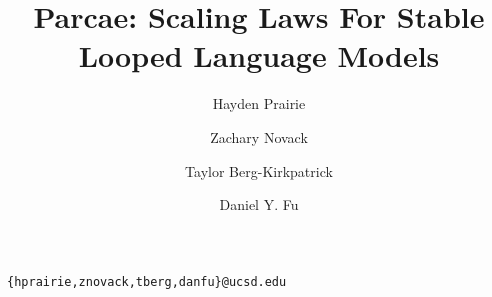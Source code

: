 \documentclass[11pt]{article}
\title{Parcae: Scaling Laws For Stable Looped Language Models}
\author[1,2]{Hayden Prairie}
\author[1]{Zachary Novack}
\author[1]{Taylor Berg-Kirkpatrick}
\author[1,2]{Daniel Y. Fu}
\affil[1]{University of California, San Diego}
\affil[2]{Together AI}
\date{}
\begin{document}
\setlength{\parindent}{0pt}
\setlength{\parskip}{0.5em}  %


\maketitle

\vspace{-5.5em}  %
\begin{center}
\texttt{\{hprairie,znovack,tberg,danfu\}@ucsd.edu}
\end{center}


\vspace{-1em}
\begin{abstract}
  
\end{abstract}











\appendix



















\end{document}
